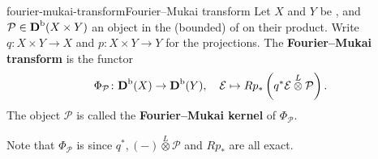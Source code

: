 \begin{topic}{fourier-mukai-transform}{Fourier--Mukai transform}
    Let $X$ and $Y$ be  , and $\mathcal{P} \in \textbf{D}^\textup{b}(X \times Y)$ an object in the (bounded)  of  on their product. Write $q \colon X \times Y \to X$ and $p \colon X \times Y \to Y$ for the projections. The \textbf{Fourier--Mukai transform} is the functor
    \[ \Phi_\mathcal{P} \colon \textbf{D}^\textup{b}(X) \to \textbf{D}^\textup{b}(Y), \quad \mathcal{E} \mapsto R p_* \left( q^* \mathcal{E} \overset{L}{\otimes} \mathcal{P} \right) . \]
    The object $\mathcal{P}$ is called the \textbf{Fourier--Mukai kernel} of $\Phi_\mathcal{P}$.
    
    Note that $\Phi_\mathcal{P}$ is  since $q^*, (-) \overset{L}{\otimes} \mathcal{P}$ and $R p_*$ are all exact.
\end{topic}

